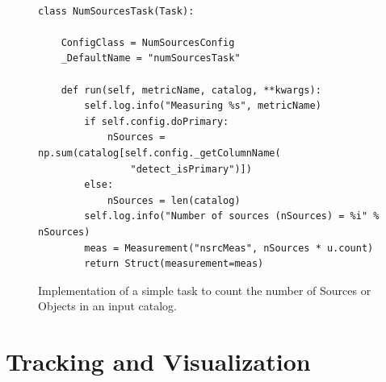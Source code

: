 \begin{figure}[!htp]
  \lstset{language=python}
  \begin{lstlisting}
  
class NumSourcesTask(Task):

    ConfigClass = NumSourcesConfig
    _DefaultName = "numSourcesTask"

    def run(self, metricName, catalog, **kwargs):
        self.log.info("Measuring %s", metricName)
        if self.config.doPrimary:
            nSources = np.sum(catalog[self.config._getColumnName(
                "detect_isPrimary")])
        else:
            nSources = len(catalog)
        self.log.info("Number of sources (nSources) = %i" % nSources)
        meas = Measurement("nsrcMeas", nSources * u.count)
        return Struct(measurement=meas)    \end{lstlisting}
        
  \caption{Implementation of a simple task to count the number of Sources or Objects in an input catalog. }
  \label{fig:num_sources_task}
  \par\medskip
\end{figure}

\section{Tracking and Visualization} \label{sec:tracking}


